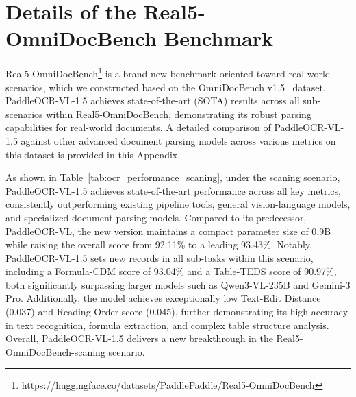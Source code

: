 \documentclass[11pt, a4paper,logo,  copyright, nonumbering]{paddleocr}
\begin{document}
\clearpage 
\newpage


\section{Details of the Real5-OmniDocBench Benchmark}
\label{sec:Details of the Real5-OmniDocBench Benchmark}
Real5-OmniDocBench\footnote{https://huggingface.co/datasets/PaddlePaddle/Real5-OmniDocBench} is a brand-new benchmark oriented toward real-world scenarios, which we constructed based on the OmniDocBench v1.5~\cite{ouyang2025omnidocbench} dataset. PaddleOCR-VL-1.5 achieves state-of-the-art (SOTA) results across all sub-scenarios within Real5-OmniDocBench, demonstrating its robust parsing capabilities for real-world documents. A detailed comparison of PaddleOCR-VL-1.5 against other advanced document parsing models across various metrics on this dataset is provided in this Appendix.

As shown in Table~\ref{tab:ocr_performance_scaning}, under the scaning scenario, PaddleOCR-VL-1.5 achieves state-of-the-art performance across all key metrics, consistently outperforming existing pipeline tools, general vision-language models, and specialized document parsing models. Compared to its predecessor, PaddleOCR-VL, the new version maintains a compact parameter size of 0.9B while raising the overall score from 92.11\% to a leading 93.43\%. Notably, PaddleOCR-VL-1.5 sets new records in all sub-tasks within this scenario, including a Formula-CDM score of 93.04\% and a Table-TEDS score of 90.97\%, both significantly surpassing larger models such as Qwen3-VL-235B and Gemini-3 Pro. Additionally, the model achieves exceptionally low Text-Edit Distance (0.037) and Reading Order score (0.045), further demonstrating its high accuracy in text recognition, formula extraction, and complex table structure analysis. Overall, PaddleOCR-VL-1.5 delivers a new breakthrough in the Real5-OmniDocBench-scaning scenario.
\end{document}
